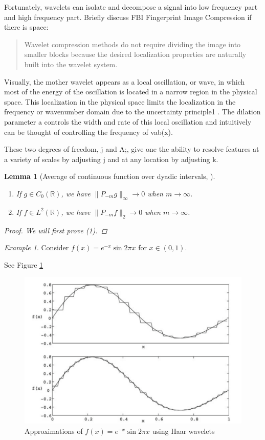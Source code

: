 \documentclass[11pt]{amsart}
\author{Jason Ngo}
\theoremstyle{theorem} %
\newtheorem{lem}[thm]{Lemma} %
\theoremstyle{definition}
\theoremstyle{example}
\theoremstyle{remark}
\newtheorem{exmp}[thm]{Example}
\numberwithin{equation}{section}
\newcommand{\R}{\mathbb{R}}
\begin{document}
	
	Fortunately, wavelets can isolate and decompose a signal into low frequency part and high frequency part.
	Briefly discuss FBI Fingerprint Image Compression if there is space:
	\begin{quote}
		Wavelet compression methods do not require dividing the image into smaller blocks because the desired localization properties are naturally built into the wavelet system.\cite{frazier}
	\end{quote}
	
	Visually, the mother
	wavelet appears as a local oscillation, or wave, in which most of the
	energy of the oscillation is located in a narrow region in the physical
	space. This localization in the physical space limits the localization in the frequency or wavenumber domain due to the uncertainty
	principle1 . The dilation parameter a controls the width and rate of
	this local oscillation and intuitively can be thought of controlling the
	frequency of vab(x).
	
	
	These two degrees of freedom, j and A;, give one the ability to resolve
	features at a variety of scales by adjusting j and at any location by
	adjusting k.
	
	\begin{lem}[Average of continuous function over dyadic intervals, {\cite[295]{pinsky}}] \label{lem:average} \quad
		\begin{enumerate}
			\item If $ g \in C_0(\R) $, we have $ \| P_{-m}g \|_\infty \to 0 $ when $ m \to \infty $.
			\item If $ f \in L^2(\R) $, we have $ \| P_{-m}f \|_2 \to 0 $ when $ m \to \infty $.
		\end{enumerate}
	
		\begin{proof}
			We will first prove (1).
		\end{proof}
	\end{lem}
	
	\begin{exmp}
		Consider $ f(x) = e^{-x} \sin 2\pi x $ for $ x \in (0,1) $.
		
		See Figure \ref{fig:approximations} 
	\end{exmp}
	
	
	
	\begin{figure}
		\centering
		\includegraphics[width=0.7\linewidth]{img/approximations}
		\caption{Approximations of $ f(x) = e^{-x} \sin{2\pi x} $ using Haar wavelets \cite{lepik}}
		\label{fig:approximations}
	\end{figure}
	
\end{document}

